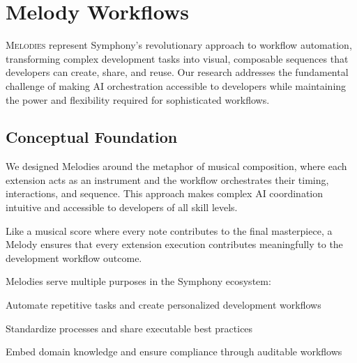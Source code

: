 
\section*{Melody Workflows}

\vspace{0.5cm}
\lettrine{M}{elodies} represent Symphony's revolutionary approach to workflow automation, transforming complex development tasks into visual, composable sequences that developers can create, share, and reuse. Our research addresses the fundamental challenge of making AI orchestration accessible to developers while maintaining the power and flexibility required for sophisticated workflows.

\subsection*{Conceptual Foundation}

We designed Melodies around the metaphor of musical composition, where each extension acts as an instrument and the workflow orchestrates their timing, interactions, and sequence. This approach makes complex AI coordination intuitive and accessible to developers of all skill levels.

\begin{infobox}[title=Musical Metaphor in Practice]
Like a musical score where every note contributes to the final masterpiece, a Melody ensures that every extension execution contributes meaningfully to the development workflow outcome.
\end{infobox}

Melodies serve multiple purposes in the Symphony ecosystem:

\begin{description}[leftmargin=4cm,labelwidth=3.5cm]
    \item[\textbf{Individual Developers}] Automate repetitive tasks and create personalized development workflows
    \item[\textbf{Development Teams}] Standardize processes and share executable best practices
    \item[\textbf{Organizations}] Embed domain knowledge and ensure compliance through auditable workflows
\end{description}

